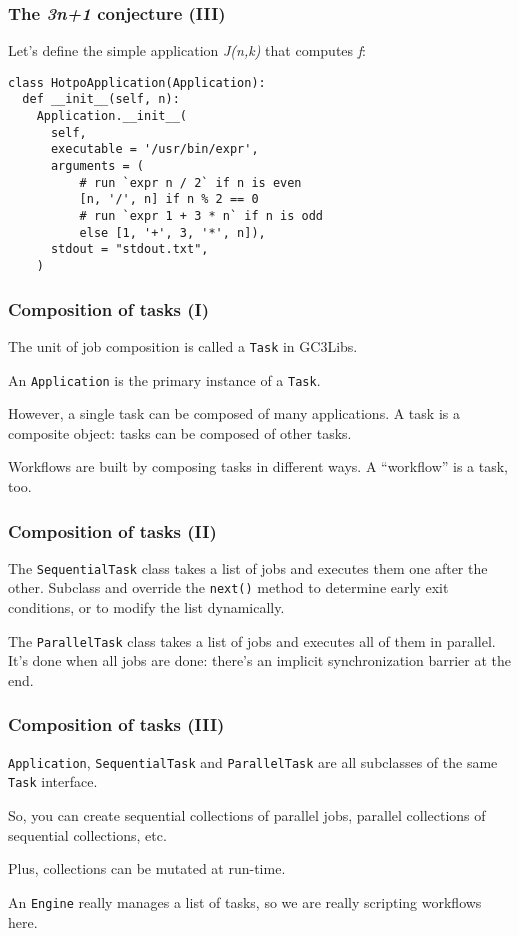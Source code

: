 \documentclass[presentation]{beamer}
\begin{document}
\begin{frame}[fragile]
\frametitle{The \emph{3n+1} conjecture (III)}
\label{sec-26}

  Let's define the simple application \emph{J(n,k)} that computes \emph{f}:
\begin{verbatim}
class HotpoApplication(Application):
  def __init__(self, n):
    Application.__init__(
      self,
      executable = '/usr/bin/expr',
      arguments = (
          # run `expr n / 2` if n is even
          [n, '/', n] if n % 2 == 0
          # run `expr 1 + 3 * n` if n is odd
          else [1, '+', 3, '*', n]),
      stdout = "stdout.txt",
    )
\end{verbatim}
  
\end{frame}
\begin{frame}
\frametitle{Composition of tasks (I)}
\label{sec-27}

  The unit of job composition is called a \texttt{Task} in GC3Libs.

  An \texttt{Application} is the primary instance of a \texttt{Task}.

  However, a single task can be composed of many applications.
  A task is a composite object: tasks can be composed of other tasks.

  Workflows are built by composing tasks in different ways.
  A ``workflow'' is a task, too.
\end{frame}
\begin{frame}
\frametitle{Composition of tasks (II)}
\label{sec-28}

  The \texttt{SequentialTask} class takes a list of jobs and executes them
  one after the other. Subclass and override the \texttt{next()} method to
  determine early exit conditions, or to modify the list dynamically.

  The \texttt{ParallelTask} class takes a list of jobs and executes all of
  them in parallel.  It's done when all jobs are done: there's an
  implicit synchronization barrier at the end.
  
\end{frame}
\begin{frame}
\frametitle{Composition of tasks (III)}
\label{sec-29}

  \texttt{Application}, \texttt{SequentialTask} and \texttt{ParallelTask} are all
  subclasses of the same \texttt{Task} interface.

  So, you can create sequential collections of parallel jobs, parallel
  collections of sequential collections, etc.

  Plus, collections can be mutated at run-time.

  An \texttt{Engine} really manages a list of tasks, so we are really
  scripting workflows here.
\end{frame}
\end{document}
